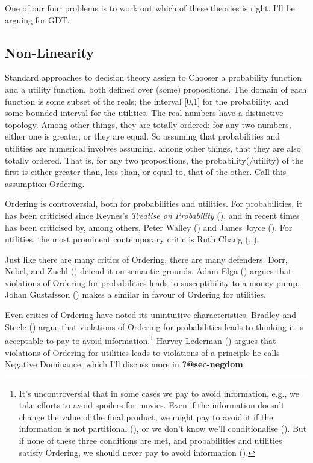 \documentclass[
  10pt,
  letterpaper,
  DIV=11,
  numbers=noendperiod,
  twoside]{scrartcl}
\begin{document}
One of our four problems is to work out which of these theories is
right. I'll be arguing for GDT.

\subsection{Non-Linearity}\label{sec-intro-ordering}

Standard approaches to decision theory assign to Chooser a probability
function and a utility function, both defined over (some) propositions.
The domain of each function is some subset of the reals; the interval
{[}0,1{]} for the probability, and some bounded interval for the
utilities. The real numbers have a distinctive topology. Among other
things, they are totally ordered: for any two numbers, either one is
greater, or they are equal. So assuming that probabilities and utilities
are numerical involves assuming, among other things, that they are also
totally ordered. That is, for any two propositions, the
probability(/utility) of the first is either greater than, less than, or
equal to, that of the other. Call this assumption Ordering.

Ordering is controversial, both for probabilities and utilities. For
probabilities, it has been criticised since Keynes's \emph{Treatise on
Probability} (), and in recent times has
been criticised by, among others, Peter Walley
() and James Joyce
(). For utilities, the most prominent
contemporary critic is Ruth Chang (,
).

Just like there are many critics of Ordering, there are many defenders.
Dorr, Nebel, and Zuehl () defend it on
semantic grounds. Adam Elga () argues that
violations of Ordering for probabilities leads to susceptibility to a
money pump. Johan Gustafsson () makes
a similar in favour of Ordering for utilities.

Even critics of Ordering have noted its unintuitive characteristics.
Bradley and Steele () argue that
violations of Ordering for probabilities leads to thinking it is
acceptable to pay to avoid information.\footnote{It's uncontroversial
  that in some cases we pay to avoid information, e.g., we take efforts
  to avoid spoilers for movies. Even if the information doesn't change
  the value of the final product, we might pay to avoid it if the
  information is not partitional (), or
  we don't know we'll conditionalise (). But if none of these three conditions are met, and
  probabilities and utilities satisfy Ordering, we should never pay to
  avoid information ().}
Harvey Lederman () argues that violations
of Ordering for utilities leads to violations of a principle he calls
Negative Dominance, which I'll discuss more in \textbf{?@sec-negdom}.
\end{document}
